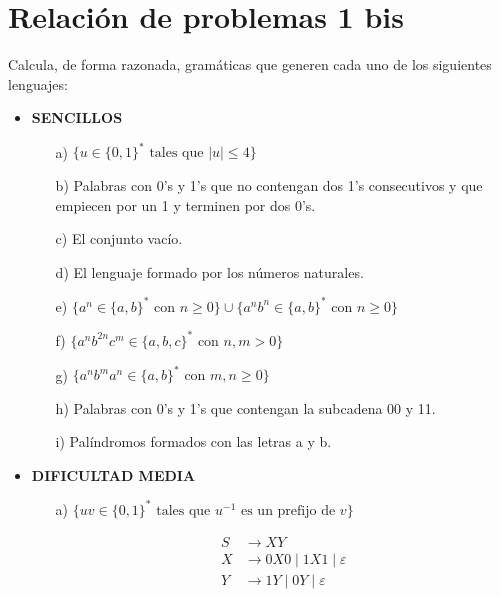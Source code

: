 \documentclass[12pt]{report} %
\begin{document}
\newpage

\hypertarget{relaciuxf3n-de-problemas-1-bis}{%
\section{Relación de problemas 1
bis}\label{relaciuxf3n-de-problemas-1-bis}}

\begin{ejercicio}
Calcula, de forma razonada, gramáticas que generen cada uno de los siguientes lenguajes:

\begin{itemize}
    \item \textbf{SENCILLOS}
    \begin{itemize}
        \item[a)] $\{u \in \{0, 1\}^* \text{ tales que } |u| \leq 4\}$
        \item[b)] Palabras con 0’s y 1’s que no contengan dos 1’s consecutivos y que empiecen por un 1 y terminen por dos 0’s.
        \item[c)] El conjunto vacío.
        \item[d)] El lenguaje formado por los números naturales.
        \item[e)] $\{a^n \in \{a, b\}^* \text{ con } n \geq 0\} \cup \{a^n b^n \in \{a, b\}^* \text{ con } n \geq 0\}$
        \item[f)] $\{a^n b^{2n} c^m \in \{a, b, c\}^* \text{ con } n, m > 0\}$
        \item[g)] $\{a^n b^m a^n \in \{a, b\}^* \text{ con } m, n \geq 0\}$
        \item[h)] Palabras con 0’s y 1’s que contengan la subcadena 00 y 11.
        \item[i)] Palíndromos formados con las letras a y b.
    \end{itemize}

    \item \textbf{DIFICULTAD MEDIA}
    \begin{itemize}
        \item[a)] $\{uv \in \{0, 1\}^* \text{ tales que } u^{-1} \text{ es un prefijo de } v\}$
        \begin{solucion}[media.a]

        \begin{align*}
        S &\rightarrow XY \\
        X &\rightarrow 0X0 \mid 1X1 \mid \varepsilon \\
        Y &\rightarrow 1Y \mid 0Y \mid \varepsilon 
        \end{align*}


\end{solucion}
\end{itemize}
\end{itemize}
\end{ejercicio}
\end{document}

